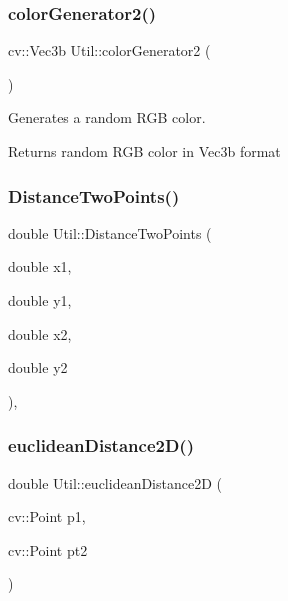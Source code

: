 \hypertarget{class_util_a4b35aebe2f6ea734a9221356c0ad38ec}{}\label{class_util_a4b35aebe2f6ea734a9221356c0ad38ec} 
\subsubsection{\texorpdfstring{color\+Generator2()}{colorGenerator2()}}
{\footnotesize\ttfamily cv\+::\+Vec3b Util\+::color\+Generator2 (\begin{DoxyParamCaption}{ }\end{DoxyParamCaption})\hspace{0.3cm}{\ttfamily [static]}}



Generates a random R\+GB color. 

\begin{DoxyReturn}{Returns}
random R\+GB color in Vec3b format 
\end{DoxyReturn}
\hypertarget{class_util_aa03b701f4479e96b87e122abaa87804d}{}\label{class_util_aa03b701f4479e96b87e122abaa87804d} 
\subsubsection{\texorpdfstring{Distance\+Two\+Points()}{DistanceTwoPoints()}}
{\footnotesize\ttfamily double Util\+::\+Distance\+Two\+Points (\begin{DoxyParamCaption}\item[{double}]{x1,  }\item[{double}]{y1,  }\item[{double}]{x2,  }\item[{double}]{y2 }\end{DoxyParamCaption})\hspace{0.3cm}{\ttfamily [static]}, {\ttfamily [private]}}

\hypertarget{class_util_a4212455c03e1a5ec0262f1df778bdc47}{}\label{class_util_a4212455c03e1a5ec0262f1df778bdc47} 
\subsubsection{\texorpdfstring{euclidean\+Distance2\+D()}{euclideanDistance2D()}}
{\footnotesize\ttfamily double Util\+::euclidean\+Distance2D (\begin{DoxyParamCaption}\item[{cv\+::\+Point}]{p1,  }\item[{cv\+::\+Point}]{pt2 }\end{DoxyParamCaption})\hspace{0.3cm}{\ttfamily [static]}}

